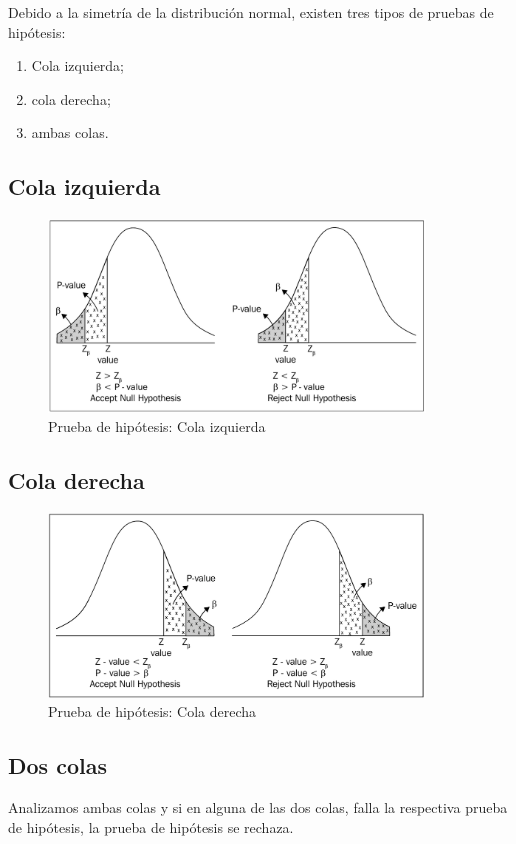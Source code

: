 Debido a la simetría de la distribución normal, existen tres tipos de pruebas de hipótesis:
\begin{enumerate}
	\item Cola izquierda;
	\item cola derecha;
	\item ambas colas.
\end{enumerate}


\subsection{Cola izquierda}
\begin{figure}
	\centering
	\includegraphics[width=10cm,keepaspectratio=true]{./images/kum0403.png}
	\caption{Prueba de hipótesis: Cola izquierda}
	\label{kum0403}
\end{figure}


\subsection{Cola derecha}
\begin{figure}
	\centering
	\includegraphics[width=10cm,keepaspectratio=true]{./images/kum0404.png}
	\caption{Prueba de hipótesis: Cola derecha}
	\label{kum0403}
\end{figure}


\subsection{Dos colas}
Analizamos ambas colas y si en alguna de las dos colas, falla la respectiva prueba de hipótesis, la prueba de hipótesis se rechaza.

